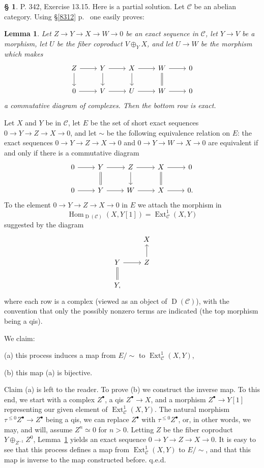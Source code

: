 \documentclass[12pt]{article}
\newtheorem{lem}[thm]{Lemma}
\theoremstyle{remark}
\theoremstyle{definition}
\newtheorem{s}[thm]{\S}
\newcommand{\nn}{\noindent}
\newcommand{\oo}{\operatorname}
\newcommand{\C}{\mathcal C}
\DeclareMathOperator{\Hom}{Hom}%
\begin{document}
\nn[\S\ref{1341b} p.~\pageref{1341b} will be inserted here.]

%
\begin{s} 
P. 342, Exercise 13.15. Here is a partial solution. Let $\C$ be an abelian category. Using \S\ref{8312} p.~\pageref{8312} one easily proves:

\begin{lem}\label{738}
Let $Z\to Y\to X\to W\to0$ be an exact sequence in $\C$, let $Y\to V$ be a morphism, let $U$ be the fiber coproduct $V\oplus_YX$, and let $U\to W$ be the morphism which makes 
$$
\begin{tikzcd}
Z\ar{d}\ar{r}&Y\ar{d}\ar{r}&X\ar{d}\ar{r}&W\ar[equal]{d}\ar{r}&0\\ 
0\ar{r}&V\ar{r}&U\ar{r}&W\ar{r}&0
\end{tikzcd}
$$ 
a commutative diagram of complexes. Then the bottom row is exact.
\end{lem}

Let $X$ and $Y$ be in $\C$, let $E$ be the set of short exact sequences $0\to Y\to Z\to X\to0$, and let $\sim$ be the following equivalence relation on $E$: the exact sequences $0\to Y\to Z\to X\to0$ and $0\to Y\to W\to X\to0$ are equivalent if and only if there is a commutative diagram 
$$
\begin{tikzcd}
0\ar{r}&Y\ar[equal]{d}\ar{r}&Z\ar{d}\ar{r}&X\ar[equal]{d}\ar{r}&0\\ 
0\ar{r}&Y\ar{r}&W\ar{r}&X\ar{r}&0.
\end{tikzcd}
$$ 
To the element $0\to Y\to Z\to X\to0$ in $E$ we attach the morphism in 
$$
\Hom_{\oo D(\C)}(X,Y[1])=\oo{Ext}^1_\C(X,Y)
$$ 
suggested by the diagram 
$$
\begin{tikzcd}
{}&X\\ 
Y\ar[equal]{d}\ar{r}&Z\ar{u}\\ 
Y,
\end{tikzcd}
$$ 
where each row is a complex (viewed as an object of $\oo D(\C)$), with the convention that only the possibly nonzero terms are indicated (the top morphism being a qis). 

We claim: 

(a) this process induces a map from $E/\!\!\sim$ to $\oo{Ext}^1_\C(X,Y)$, 

(b) this map (a) is bijective. 

Claim (a) is left to the reader. To prove (b) we construct the inverse map. To this end, we start with a complex $Z^\bullet$, a qis $Z^\bullet\to X$, and a morphism $Z^\bullet\to Y[1]$ representing our given element of $\oo{Ext}^1_\C(X,Y)$. The natural morphism $\tau^{\le0}Z^\bullet\to Z^\bullet$ being a qis, we can replace $Z^\bullet$ with $\tau^{\le0}Z^\bullet$, or, in other words, we may, and will, assume $Z^n\simeq0$ for $n>0$. Letting $Z$ be the fiber coproduct $Y\oplus_{Z^{-1}}Z^0$, Lemma~\ref{738} yields an exact sequence $0\to Y\to Z\to X\to0$. It is easy to see that this process defines a map from $\oo{Ext}^1_\C(X,Y)$ to $E/\!\!\sim$, and that this map is inverse to the map constructed before. q.e.d.
\end{s}
%
%
\end{document}
